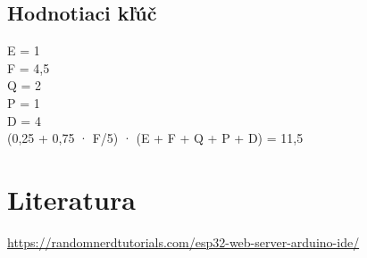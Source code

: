 \documentclass[a4paper, 11pt]{article}
\begin{document}
\subsection{Hodnotiaci kľúč}
E = 1\\
F = 4,5\\
Q = 2\\
P = 1\\
D = 4\\
(0,25 + 0,75 · F/5) · (E + F + Q + P + D) = 11,5

\section{Literatura}
\href{https://randomnerdtutorials.com/esp32-web-server-arduino-ide/
}{https://randomnerdtutorials.com/esp32-web-server-arduino-ide/}
\end{document}
